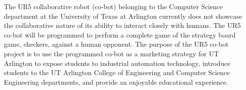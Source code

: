 The UR5 collaborative robot (co-bot) belonging to the Computer Science department at the University of Texas at Arlington currently does not showcase the collaborative nature of its ability to interact closely with humans. The UR5 co-bot will be programmed to perform a complete game of the strategy board game, checkers, against a human opponent. The purpose of the UR5 co-bot project is to use the programmed co-bot as a marketing strategy for UT Arlington to expose students to industrial automation technology, introduce students to the UT Arlington College of Engineering and Computer Science Engineering departments, and provide an enjoyable educational experience. 

